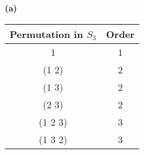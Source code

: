 \begin{enumerate}
      \textbf{(a)}
      \begin{center}
         \begin{tabular}{@{}|c|c|@{}}   \hline
            Permutation in $S_3$    & Order   \\ \hline
            1        & 1       \\ \hline
            (1 2)    & 2       \\ \hline 
            (1 3)    & 2       \\ \hline
            (2 3)    & 2       \\ \hline
            (1 2 3)  & 3       \\ \hline
            (1 3 2)  & 3       \\ \hline
         \end{tabular}
      \end{center}


\end{enumerate}
